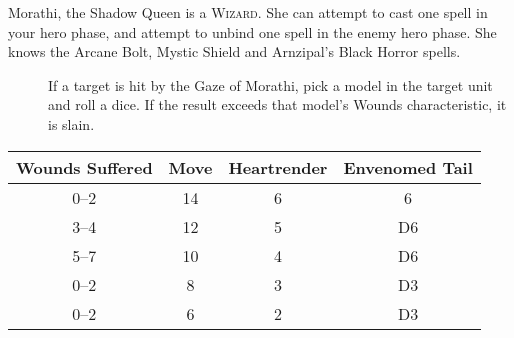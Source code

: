 Morathi, the Shadow Queen is a \textsc{Wizard}. She can attempt to cast one
spell in your hero phase, and attempt to unbind one spell in the enemy hero
phase. She knows the Arcane Bolt, Mystic Shield and Arnzipal’s Black Horror
spells.

\begin{description}
   \item [] If a target is hit by the
        Gaze of Morathi, pick a model in the target unit and roll a dice. If the
        result exceeds that model's Wounds characteristic, it is slain.
\end{description}

\begin{scriptsize}
\noindent
    \begin{tabular}{cccc} %
    \toprule
    Wounds Suffered & Move & Heartrender & Envenomed Tail \\
    \midrule
    0--2 & 14 &  6  & 6 \\
    3--4 & 12 &  5  & D6 \\
    5--7 & 10 &  4  & D6 \\
    0--2 &  8 &  3  & D3 \\
    0--2 &  6 &  2  & D3 \\
    \bottomrule
\end{tabular}
\end{scriptsize}


\newpage %

